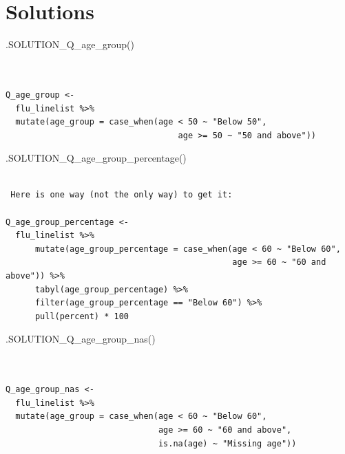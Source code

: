 \documentclass[
  letterpaper,
  DIV=11,
  numbers=noendperiod]{scrreprt}
\newenvironment{Shaded}{\begin{snugshade}}{\end{snugshade}}
\newcommand{\FunctionTok}[1]{\textcolor[rgb]{0.28,0.35,0.67}{#1}}
\newcommand{\NormalTok}[1]{\textcolor[rgb]{0.00,0.23,0.31}{#1}}
\begin{document}
\hypertarget{solutions-4}{%
\section{Solutions}\label{solutions-4}}

\begin{Shaded}
\begin{Highlighting}[]
\FunctionTok{.SOLUTION\_Q\_age\_group}\NormalTok{()}
\end{Highlighting}
\end{Shaded}

\begin{verbatim}


Q_age_group <- 
  flu_linelist %>% 
  mutate(age_group = case_when(age < 50 ~ "Below 50", 
                                   age >= 50 ~ "50 and above"))
\end{verbatim}

\begin{Shaded}
\begin{Highlighting}[]
\FunctionTok{.SOLUTION\_Q\_age\_group\_percentage}\NormalTok{()}
\end{Highlighting}
\end{Shaded}

\begin{verbatim}

 Here is one way (not the only way) to get it:
  
Q_age_group_percentage <- 
  flu_linelist %>% 
      mutate(age_group_percentage = case_when(age < 60 ~ "Below 60", 
                                              age >= 60 ~ "60 and above")) %>% 
      tabyl(age_group_percentage) %>% 
      filter(age_group_percentage == "Below 60") %>% 
      pull(percent) * 100
\end{verbatim}

\begin{Shaded}
\begin{Highlighting}[]
\FunctionTok{.SOLUTION\_Q\_age\_group\_nas}\NormalTok{()}
\end{Highlighting}
\end{Shaded}

\begin{verbatim}


Q_age_group_nas <- 
  flu_linelist %>% 
  mutate(age_group = case_when(age < 60 ~ "Below 60", 
                               age >= 60 ~ "60 and above", 
                               is.na(age) ~ "Missing age"))
\end{verbatim}
\end{document}
